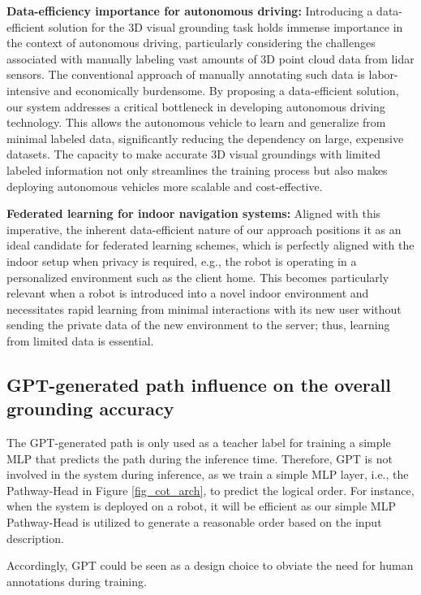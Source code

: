 \noindent \textbf{Data-efficiency importance for autonomous driving:}
Introducing a data-efficient solution for the 3D visual grounding task holds immense importance in the context of autonomous driving, particularly considering the challenges associated with manually labeling vast amounts of 3D point cloud data from lidar sensors. 
The conventional approach of manually annotating such data is labor-intensive and economically burdensome. 
By proposing a data-efficient solution, our system addresses a critical bottleneck in developing autonomous driving technology. 
This allows the autonomous vehicle to learn and generalize from minimal labeled data, significantly reducing the dependency on large, expensive datasets.
The capacity to make accurate 3D visual groundings with limited labeled information not only streamlines the training process but also makes deploying autonomous vehicles more scalable and cost-effective. 

\noindent \textbf{Federated learning for indoor navigation systems:}
Aligned with this imperative, the inherent data-efficient nature of our approach positions it as an ideal candidate for federated learning schemes, which is perfectly aligned with the indoor setup when privacy is required, e.g., the robot is operating in a personalized environment such as the client home.
This becomes particularly relevant when a robot is introduced into a novel indoor environment and necessitates rapid learning from minimal interactions with its new user without sending the private data of the new environment to the server; thus, learning from limited data is essential.

\subsection{GPT-generated path influence on the overall grounding accuracy}
\label{appendix_GPT-generated_path}

The GPT-generated path is only used as a teacher label for training a simple MLP that predicts the path during the inference time.
Therefore, GPT is not involved in the system during inference, as we train a simple MLP layer, i.e., the Pathway-Head in Figure \ref{fig_cot_arch}, to predict the logical order.
For instance, when the system is deployed on a robot, it will be efficient as our simple MLP Pathway-Head is utilized to generate a reasonable order based on the input description.

Accordingly, GPT could be seen as a design choice to obviate the need for human annotations during training.

